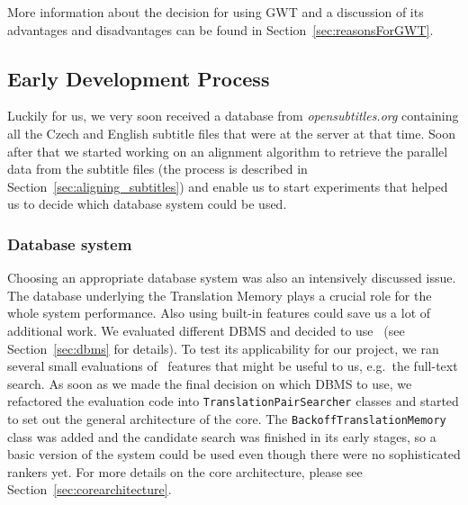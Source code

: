 More information about the decision for using GWT and a discussion of its advantages and disadvantages can be found in Section~\ref{sec:reasonsForGWT}.





\subsection{Early Development Process}

Luckily for us, we very soon received a database from {\it opensubtitles.org} containing all the Czech and English subtitle files that were at the server at that time. Soon after that we started working on an alignment algorithm to retrieve the parallel data from the subtitle files (the process is described in Section~\ref{sec:aligning_subtitles}) and enable us to start experiments that helped us to decide which database system could be used.


\subsubsection{Database system}

Choosing an appropriate database system was also an intensively discussed issue. The database underlying the Translation Memory plays a crucial role for the whole system performance. Also using built-in features could save us a lot of additional work.
We evaluated different DBMS and decided to use \postgres~(see Section~\ref{sec:dbms} for details). To test its applicability for our project, we ran several small evaluations of \postgres~features that might be useful to us, e.g.\ the full-text search. As soon as we made the final decision on which DBMS to use, we refactored the evaluation code into {\tt TranslationPairSearcher} classes and started to set out the general architecture of the core. The {\tt BackoffTranslationMemory} class was added and the candidate search was finished in its early stages, so a basic version of the system could be used even though there were no sophisticated rankers yet. For more details on the core architecture, please see Section~\ref{sec:corearchitecture}.

